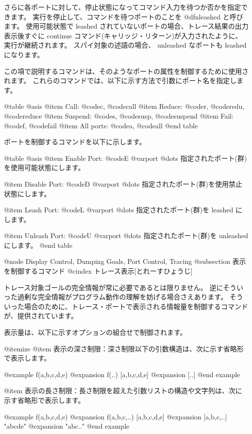 {{{{さらに各ポートに対して、停止状態になってコマンド入力を待つか否かを指定できます。
実行を停止して、コマンドを待つポートのことを @dfn{leashed} と呼びます。
使用可能状態で leashed されていないポートの場合、トレース結果の出力表示後すぐに continue コマンド(キャリッジ・リターン)が入力されたように、実行が継続されます。
スパイ対象の述語の場合、 unleashed なポートも leashed になります。

この項で説明するコマンドは、そのようなポートの属性を制御するために使用されます。
これらのコマンドでは、以下に示す方法で引数にポート名を指定します。

@table @asis
@item Call:
@code{c}, @code{call}
@item Reduce:
@code{r}, @code{redu}, @code{reduce}
@item Suspend:
@code{s}, @code{susp}, @code{suspend}
@item Fail:
@code{f}, @code{fail}
@item All ports:
@code{a}, @code{all}
@end table

ポートを制御するコマンドを以下に示します。

@table @asis
@item Enable Port: @code{E} @var{port} @dots{}
指定されたポート(群)を使用可能状態にします。

@item Disable Port: @code{D} @var{port} @dots{}
指定されたポート(群)を使用禁止状態にします。

@item Leash Port: @code{L} @var{port} @dots{}
指定されたポート(群)を leashed にします。

@item Unleash Port: @code{U} @var{port} @dots{}
指定されたポート(群)を unleashed にします。
@end table

@node Display Control, Dumping Goals, Port Control, Tracing
@subsection 表示を制御するコマンド
@cindex トレース表示[とれーすひょうじ]

トレース対象ゴールの完全情報が常に必要であるとは限りません。
逆にそういった過剰な完全情報がプログラム動作の理解を妨げる場合さえあります。
そういった場合のために、トレース・ポートで表示される情報量を制御するコマンドが、提供されています。

表示量は、以下に示すオプションの組合せで制御されます。

@itemize
@item 表示の深さ制限：深さ制限以下の引数構造は、次に示す省略形で表示します。

@example
f(a,b,c,d,e)    @expansion{}    f(..)
[a,b,c,d,e]     @expansion{}    [..]
@end example

@item 表示の長さ制限：長さ制限を超えた引数リストの構造や文字列は、次に示す省略形で表示します。

@example
f(a,b,c,d,e)    @expansion{}    f(a,b,c,..)
[a,b,c,d,e]     @expansion{}    [a,b,c,..]
"abcde"         @expansion{}    "abc.."
@end example

}}}}
